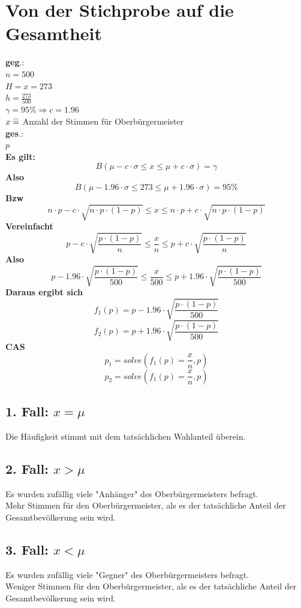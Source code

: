 \documentclass[a4paper,12pt]{article}
\newcommand\equalhat{\mathrel{\stackon[1.5pt]{=}{\stretchto{%
    \scalerel*[\widthof{=}]{\wedge}{\rule{1ex}{3ex}}}{0.5ex}}}}
\begin{document}
\section{Von der Stichprobe auf die Gesamtheit}
\textbf{geg}.:\\
$n = 500$\\
$H = x = 273$\\
$h = \frac{273}{500}$\\
$\gamma = 95\% \Rightarrow c = 1.96$\\
$x \equalhat$ Anzahl der Stimmen für Oberbürgermeister\\
\textbf{ges}.:\\
$p$\\
\textbf{Es gilt:}\\
$$B(\mu - c \cdot \sigma \leq x \leq \mu + c \cdot \sigma) = \gamma$$
\textbf{Also}
$$B(\mu - 1.96 \cdot \sigma \leq 273 \leq \mu + 1.96 \cdot \sigma) = 95\%$$
\textbf{Bzw}\\
$$n \cdot p - c \cdot \sqrt{n \cdot p \cdot (1 - p)} \leq x \leq n \cdot p + c \cdot \sqrt{n \cdot p \cdot (1 - p)}$$
\textbf{Vereinfacht}\\
$$p - c \cdot \sqrt{\frac{p \cdot (1 - p)}{n}} \leq \frac{x}{n} \leq p + c \cdot \sqrt{\frac{p \cdot (1 - p)}{n}}$$
\textbf{Also}\\
$$p - 1.96 \cdot \sqrt{\frac{p \cdot (1 - p)}{500}} \leq \frac{x}{500} \leq p + 1.96 \cdot \sqrt{\frac{p \cdot (1 - p)}{500}}$$
\textbf{Daraus ergibt sich}\\
$$f_{1}(p) = p - 1.96 \cdot \sqrt{\frac{p \cdot (1 - p)}{500}}$$
$$f_{2}(p) = p + 1.96 \cdot \sqrt{\frac{p \cdot (1 - p)}{500}}$$
\textbf{CAS}\\
$$p_{1} = solve(f_{1}(p) = \frac{x}{n}, p)$$
$$p_{2} = solve(f_{1}(p) = \frac{x}{n}, p)$$
\subsection*{1. Fall: $x = \mu$}
Die Häufigkeit stimmt mit dem tatsächlichen Wahlanteil überein.\\
\subsection*{2. Fall: $x > \mu$}
Es wurden zufällig viele "Anhänger" des Oberbürgermeisters befragt.\\
Mehr Stimmen für den Oberbürgermeister, als es der tatsächliche Anteil der Gesamtbevölkerung sein wird.\\
\subsection*{3. Fall: $x < \mu$}
Es wurden zufällig viele "Gegner" des Oberbürgermeisters befragt.\\
Weniger Stimmen für den Oberbürgermeister, als es der tatsächliche Anteil der Gesamtbevölkerung sein wird.\\
\pagebreak
\end{document}

